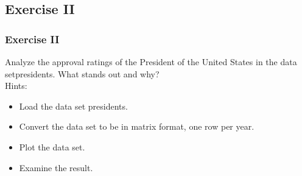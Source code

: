 



\subsection{Exercise II}
\begin{frame}[fragile]
	\frametitle{Exercise II}
	Analyze the approval ratings of the President of the United States in the data set\ttfamily presidents. \normalfont  What stands out and why?\\
  \vspace{10pt}
  \noindent Hints: \small
    \begin{itemize}
      \item Load the data set \ttfamily presidents.\normalfont
      \item Convert the data set to be in matrix format, one row per year.
      \item Plot the data set.
      \item Examine the result.
    \end{itemize}
    \normalsize
\end{frame}
